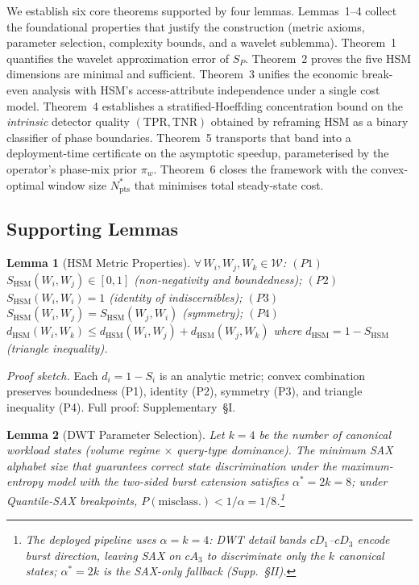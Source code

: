 \documentclass[10pt,journal,compsoc]{IEEEtran}
\newtheorem{lemma}{Lemma}
\newcommand{\SHSM}{S_{\mathrm{HSM}}}
\newcommand{\SPER}{S_{P}}
\newcommand{\Nstar}{N^{*}_{\mathrm{pts}}}
\newcommand{\dHSM}{d_{\mathrm{HSM}}}
\newcommand{\TPR}{\mathrm{TPR}}
\newcommand{\TNR}{\mathrm{TNR}}
\begin{document}
We establish six core theorems supported by four lemmas.
Lemmas~1--4 collect the foundational properties that justify the
construction (metric axioms, parameter selection, complexity bounds,
and a wavelet sublemma). Theorem~1 quantifies the wavelet approximation
error of $\SPER$. Theorem~2 proves the five HSM dimensions are minimal
and sufficient. Theorem~3 unifies the economic break-even analysis
with HSM's access-attribute independence under a single cost model.
Theorem~4 establishes a stratified-Hoeffding concentration bound on the
\emph{intrinsic} detector quality $(\TPR,\TNR)$ obtained by reframing
HSM as a binary classifier of phase boundaries. Theorem~5 transports
that band into a deployment-time certificate on the asymptotic speedup,
parameterised by the operator's phase-mix prior $\pi_w$. Theorem~6
closes the framework with the convex-optimal window size $\Nstar$
that minimises total steady-state cost.

\subsection{Supporting Lemmas}

\begin{lemma}[HSM Metric Properties]\label{lem:metric}
$\forall\,W_i,W_j,W_k\in\mathcal{W}$:
$(P1)$~$\SHSM(W_i,W_j)\!\in\![0,1]$ (non-negativity and boundedness);
$(P2)$~$\SHSM(W_i,W_i)\!=\!1$ (identity of indiscernibles);
$(P3)$~$\SHSM(W_i,W_j)\!=\!\SHSM(W_j,W_i)$ (symmetry);
$(P4)$~$\dHSM(W_i,W_k)\leq\dHSM(W_i,W_j)+\dHSM(W_j,W_k)$ where
$\dHSM\!=\!1-\SHSM$ (triangle inequality).
\end{lemma}
\noindent\textit{Proof sketch.}
Each $d_i\!=\!1\!-\!S_i$ is an analytic metric; convex combination preserves boundedness (P1), identity (P2), symmetry (P3), and triangle inequality (P4).
Full proof: Supplementary~\S I.

\begin{lemma}[DWT Parameter Selection]\label{lem:dwt}
Let $k\!=\!4$ be the number of canonical workload states (volume
regime $\times$ query-type dominance). The minimum SAX alphabet size
that guarantees correct state discrimination under the maximum-entropy
model with the two-sided burst extension satisfies $\alpha^{*}\!=\!2k\!=\!8$;
under Quantile-SAX breakpoints,
$P(\mathrm{misclass.})<1/\alpha\!=\!1/8$.\footnote{The deployed pipeline
uses $\alpha\!=\!k\!=\!4$: DWT detail bands $cD_1$--$cD_3$ encode burst
direction, leaving SAX on $cA_3$ to discriminate only the $k$ canonical
states; $\alpha^{*}\!=\!2k$ is the SAX-only fallback (Supp.~\S II).}
\end{lemma}
\end{document}
